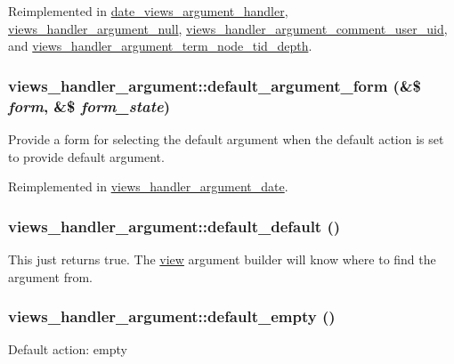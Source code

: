 Reimplemented in \hyperlink{classdate__views__argument__handler_a04e1475ee2f7f3d532342a91cde08970}{date\_\-views\_\-argument\_\-handler}, \hyperlink{classviews__handler__argument__null_a82da8fd1448e1ce346aa38d5b6021e05}{views\_\-handler\_\-argument\_\-null}, \hyperlink{classviews__handler__argument__comment__user__uid_a492e0d7daafffc95f6ac936111556559}{views\_\-handler\_\-argument\_\-comment\_\-user\_\-uid}, and \hyperlink{classviews__handler__argument__term__node__tid__depth_a507f5facd0421728d2d0a5f350839dfc}{views\_\-handler\_\-argument\_\-term\_\-node\_\-tid\_\-depth}.\hypertarget{classviews__handler__argument_a830cb037bee2daa385618a60d01c0dd1}{
\subsubsection[{default\_\-argument\_\-form}]{\setlength{\rightskip}{0pt plus 5cm}views\_\-handler\_\-argument::default\_\-argument\_\-form (\&\$ {\em form}, \/  \&\$ {\em form\_\-state})}}
\label{classviews__handler__argument_a830cb037bee2daa385618a60d01c0dd1}
Provide a form for selecting the default argument when the default action is set to provide default argument. 

Reimplemented in \hyperlink{classviews__handler__argument__date_a9c6775f6c034bfcec9cd0fe0ab0e96f2}{views\_\-handler\_\-argument\_\-date}.\hypertarget{classviews__handler__argument_a15f51f60c6183e6975d0aef857ad7f42}{
\subsubsection[{default\_\-default}]{\setlength{\rightskip}{0pt plus 5cm}views\_\-handler\_\-argument::default\_\-default ()}}
\label{classviews__handler__argument_a15f51f60c6183e6975d0aef857ad7f42}
This just returns true. The \hyperlink{classview}{view} argument builder will know where to find the argument from. \hypertarget{classviews__handler__argument_a0648192a05a597bd19ff2ba6e5bdaa91}{
\subsubsection[{default\_\-empty}]{\setlength{\rightskip}{0pt plus 5cm}views\_\-handler\_\-argument::default\_\-empty ()}}
\label{classviews__handler__argument_a0648192a05a597bd19ff2ba6e5bdaa91}
Default action: empty

